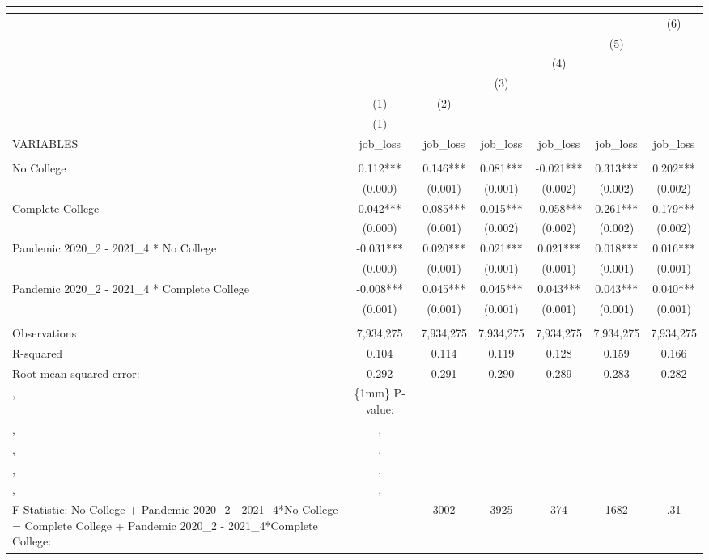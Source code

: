 \begin{tabular}{lcccccc}
\multicolumn{7}{c}{} \\ \hline
 &  &  &  &  &  & (6) \\
 &  &  &  &  & (5) &  \\
 &  &  &  & (4) &  &  \\
 &  &  & (3) &  &  &  \\
 & (1) & (2) &  &  &  &  \\
 & (1) &  &  &  &  &  \\
VARIABLES & job\_loss & job\_loss & job\_loss & job\_loss & job\_loss & job\_loss \\ \hline
 &  &  &  &  &  &  \\
No College & 0.112*** & 0.146*** & 0.081*** & -0.021*** & 0.313*** & 0.202*** \\
 & (0.000) & (0.001) & (0.001) & (0.002) & (0.002) & (0.002) \\
Complete College & 0.042*** & 0.085*** & 0.015*** & -0.058*** & 0.261*** & 0.179*** \\
 & (0.000) & (0.001) & (0.002) & (0.002) & (0.002) & (0.002) \\
Pandemic 2020\_2 - 2021\_4 * No College & -0.031*** & 0.020*** & 0.021*** & 0.021*** & 0.018*** & 0.016*** \\
 & (0.000) & (0.001) & (0.001) & (0.001) & (0.001) & (0.001) \\
Pandemic 2020\_2 - 2021\_4 * Complete College & -0.008*** & 0.045*** & 0.045*** & 0.043*** & 0.043*** & 0.040*** \\
 & (0.001) & (0.001) & (0.001) & (0.001) & (0.001) & (0.001) \\
 &  &  &  &  &  &  \\
Observations & 7,934,275 & 7,934,275 & 7,934,275 & 7,934,275 & 7,934,275 & 7,934,275 \\
R-squared & 0.104 & 0.114 & 0.119 & 0.128 & 0.159 & 0.166 \\
Root mean squared error: & 0.292 & 0.291 & 0.290 & 0.289 & 0.283 & 0.282 \\
, & \hspace\{1mm\} P-value: &  &  &  &  &  \\
, & , &  &  &  &  &  \\
, & , &  &  &  &  &  \\
, & , &  &  &  &  &  \\
, & , &  &  &  &  &  \\
F Statistic: No College + Pandemic 2020\_2 - 2021\_4*No College = Complete College + Pandemic 2020\_2 - 2021\_4*Complete College: &  & 3002 & 3925 & 374 & 1682 & .31 \\

\end{tabular}
